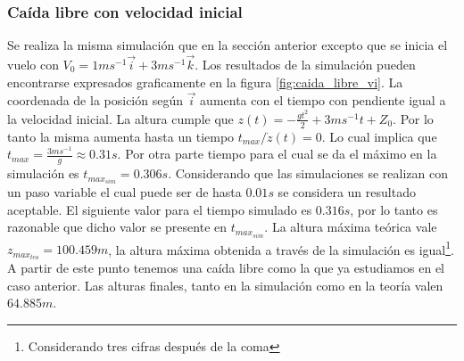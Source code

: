 \documentclass[main]{subfiles}
\begin{document}
\subsubsection{Ca\'ida libre con velocidad inicial}
Se realiza la misma simulaci\'on que en la secci\'on anterior excepto que se inicia el vuelo con $V_0 = 1ms^{-1}\vec{i}+3ms^{-1}\vec{k}$. Los resultados de la simulaci\'on pueden encontrarse expresados graficamente en la figura \ref{fig:caida_libre_vi}. La coordenada de la posici\'on seg\'un $\vec{i}$ aumenta con el tiempo con pendiente igual a la velocidad inicial. La altura cumple que $z(t)=-\frac{gt^2}{2}+3ms^{-1}t+Z_0$. Por lo tanto la misma aumenta hasta un tiempo  $t_{max} / \dot{z}(t)=0$. Lo cual implica que $t_{max}=\frac{3ms^{-1}}{g}\approx0.31s$. Por otra parte tiempo para el cual se da el m\'aximo en la simulaci\'on es $t_{max_{sim}} = 0.306s$. Considerando que las simulaciones se realizan con un paso variable el cual puede ser de hasta $0.01s$ se considera un resultado aceptable. El siguiente valor para el tiempo simulado es $0.316s$, por lo tanto es razonable que dicho valor se presente en $t_{max_{sim}}$. La altura m\'axima te\'orica vale $z_{max_{teo}}=100.459m$, la altura m\'axima obtenida a trav\'es de la simulaci\'on es igual\footnote{Considerando tres cifras despu\'es de la coma}. A partir de este punto tenemos una ca\'ida libre como la que ya estudiamos en el caso anterior. Las alturas finales, tanto en la simulaci\'on como en la teor\'ia valen $64.885m$.
\end{document}
